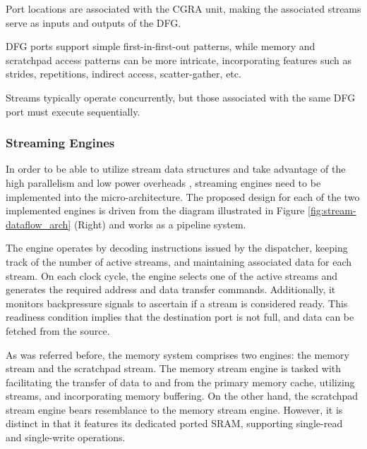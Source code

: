 Port locations are associated with the CGRA unit, making the associated streams serve as inputs and outputs of the DFG. 

DFG ports support simple first-in-first-out patterns, while memory and scratchpad access patterns can be more intricate, incorporating features such as strides, repetitions, indirect access, scatter-gather, etc.

Streams typically operate concurrently, but those associated with the same DFG port must execute sequentially.


\subsubsection{Streaming Engines}
In order to be able to utilize stream data structures and take advantage of the high parallelism and low power overheads \cite{8192490}, streaming engines need to be implemented into the micro-architecture. The proposed design for each of the two implemented engines is driven from the diagram illustrated in Figure \ref{fig:stream-dataflow_arch} (Right) and works as a pipeline system.


The engine operates by decoding instructions issued by the dispatcher, keeping track of the number of active streams, and maintaining associated data for each stream. On each clock cycle, the engine selects one of the active streams and generates the required address and data transfer commands. Additionally, it monitors backpressure signals to ascertain if a stream is considered ready. This readiness condition implies that the destination port is not full, and data can be fetched from the source.

As was referred before, the memory system comprises two engines: the memory stream and the scratchpad stream. The memory stream engine is tasked with facilitating the transfer of data to and from the primary memory cache, utilizing streams, and incorporating memory buffering. On the other hand, the scratchpad stream engine bears resemblance to the memory stream engine. However, it is distinct in that it features its dedicated ported SRAM, supporting single-read and single-write operations. 


